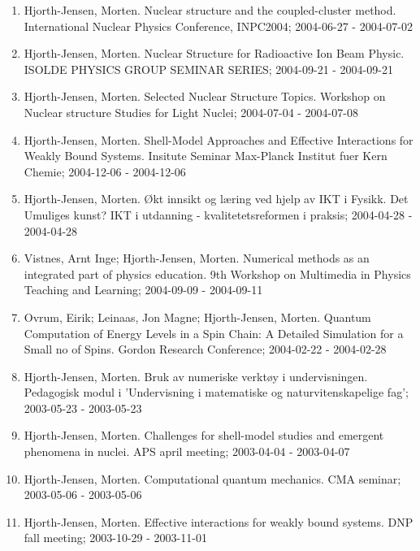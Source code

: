 \documentclass[%
oneside,                 %
final,                   %
10pt]{article}
\begin{document}
\begin{enumerate}
\item Hjorth-Jensen, Morten.  Nuclear structure and the coupled-cluster method. International Nuclear Physics Conference, INPC2004; 2004-06-27 - 2004-07-02

\item Hjorth-Jensen, Morten.  Nuclear Structure for Radioactive Ion Beam Physic. ISOLDE PHYSICS GROUP SEMINAR SERIES; 2004-09-21 - 2004-09-21

\item Hjorth-Jensen, Morten.  Selected Nuclear Structure Topics. Workshop on Nuclear structure Studies for Light Nuclei; 2004-07-04 - 2004-07-08

\item Hjorth-Jensen, Morten.  Shell-Model Approaches and Effective Interactions for Weakly Bound Systems. Insitute Seminar Max-Planck Institut fuer Kern Chemie; 2004-12-06 - 2004-12-06

\item Hjorth-Jensen, Morten. Økt innsikt og læring ved hjelp av IKT i Fysikk. Det Umuliges kunst? IKT i utdanning - kvalitetetsreformen i praksis; 2004-04-28 - 2004-04-28

\item Vistnes, Arnt Inge; Hjorth-Jensen, Morten. Numerical methods as an integrated part of physics education. 9th Workshop on Multimedia in Physics Teaching and Learning; 2004-09-09 - 2004-09-11

\item Ovrum, Eirik; Leinaas, Jon Magne; Hjorth-Jensen, Morten. Quantum Computation of Energy Levels in a Spin Chain: A Detailed Simulation for a Small no of Spins. Gordon Research Conference; 2004-02-22 - 2004-02-28

\item Hjorth-Jensen, Morten. Bruk av numeriske verktøy i undervisningen. Pedagogisk modul i 'Undervisning i matematiske og naturvitenskapelige fag'; 2003-05-23 - 2003-05-23

\item Hjorth-Jensen, Morten. Challenges for shell-model studies and emergent phenomena in nuclei. APS april meeting; 2003-04-04 - 2003-04-07

\item Hjorth-Jensen, Morten.  Computational quantum mechanics. CMA seminar; 2003-05-06 - 2003-05-06

\item Hjorth-Jensen, Morten. Effective interactions for weakly bound systems. DNP fall meeting; 2003-10-29 - 2003-11-01


\end{enumerate}
\end{document}
